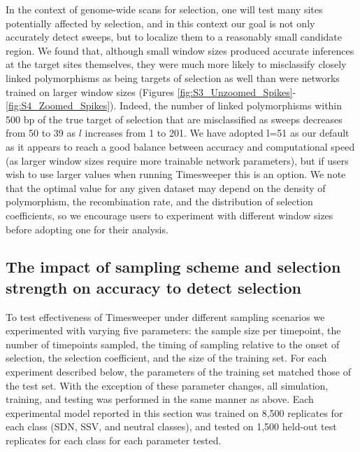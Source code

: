 In the context of genome-wide scans for selection, one will test many sites potentially affected by selection, and in this context our goal is not only accurately detect sweeps, but to localize them to a reasonably small candidate region. We found that, although small window sizes produced accurate inferences at the target sites themselves, they were much more likely to misclassify closely linked polymorphisms as being targets of selection as well than were networks trained on larger window sizes (Figures \ref{fig:S3_Unzoomed_Spikes}-\ref{fig:S4_Zoomed_Spikes}). Indeed, the number of linked polymorphisms within 500 bp of the true target of selection that are misclassified as sweeps decreases from 50 to 39 as $l$ increases from 1 to 201. We have adopted l=51 as our default as it appears to reach a good balance between accuracy and computational speed (as larger window sizes require more trainable network parameters), but if users wish to use larger values when running Timesweeper this is an option. We note that the optimal value for any given dataset may depend on the density of polymorphism, the recombination rate, and the distribution of selection coefficients, so we encourage users to experiment with different window sizes before adopting one for their analysis.  \\

\subsection{The impact of sampling scheme and selection strength on accuracy to detect selection}

To test effectiveness of Timesweeper under different sampling scenarios we experimented with varying five parameters: the sample size per timepoint, the number of timepoints sampled, the timing of sampling relative to the onset of selection, the selection coefficient, and the size of the training set. For each experiment described below, the parameters of the training set matched those of the test set. With the exception of these parameter changes, all simulation, training, and testing was performed in the same manner as above. Each experimental model reported in this section was trained on 8,500 replicates for each class (SDN, SSV, and neutral classes), and tested on 1,500 held-out test replicates for each class for each parameter tested. \\

